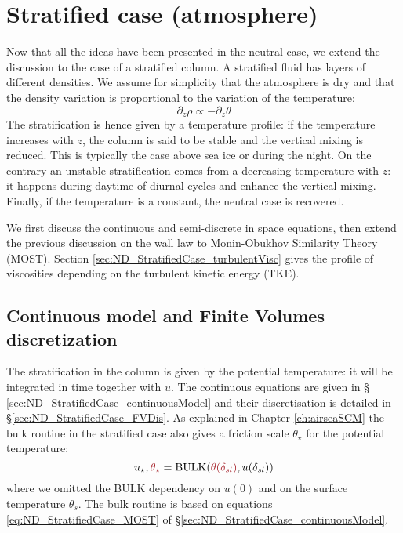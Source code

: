 \section{Stratified case (atmosphere)}
Now that all the ideas have been presented in the neutral case,
we extend the discussion to the case of a stratified column.
A stratified fluid has layers of different densities.
We assume for simplicity that the atmosphere
is dry and that the density variation is
proportional to the variation of the temperature:
\begin{equation}
	\partial_z \rho \propto
	- \partial_z \theta
\end{equation}
The stratification is hence given by a temperature profile:
if the temperature increases with $z$, the column is said
to be stable and the vertical mixing is reduced. This is
typically the case above sea ice or during the night.
On the contrary an unstable stratification comes from
a decreasing temperature with $z$: it happens
during daytime of diurnal cycles and enhance the
vertical mixing.
%
Finally, if the temperature is a constant, the neutral case is
recovered.
\par
We first discuss the continuous and semi-discrete in space
equations, then extend the previous discussion on the wall law to
Monin-Obukhov Similarity Theory (MOST).
Section \ref{sec:ND_StratifiedCase_turbulentVisc} gives the
profile of viscosities depending on the turbulent kinetic energy
(TKE).
\subsection{Continuous model and Finite Volumes discretization}
The stratification in the column is given by the
potential temperature: it will be integrated in time
together with $u$.
The continuous equations are given in \S
\ref{sec:ND_StratifiedCase_continuousModel}
and their discretisation is detailed in
\S \ref{sec:ND_StratifiedCase_FVDis}.
As explained in Chapter \ref{ch:airseaSCM}
the bulk routine in the stratified case
also gives a friction scale $\theta_\star$
for the potential temperature:
\begin{equation}
	u_\star, \emphase{\theta_\star} =
	{\rm BULK}(\emphase{\theta(\delta_{sl})},
	u(\delta_{sl}))
\end{equation}
where we omitted the BULK dependency on
$u(0)$ and on the surface temperature $\theta_s$.
The bulk routine is based on equations
\eqref{eq:ND_StratifiedCase_MOST} of
\S \ref{sec:ND_StratifiedCase_continuousModel}.
